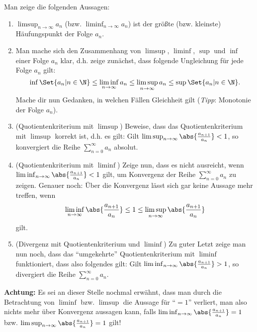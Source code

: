 \begin{exercise}
  Man zeige die folgenden Aussagen:
  \begin{enumerate}[label=(\alph*)]
  \item $\limsup_{n \to \infty} a_n$ (bzw. $\liminf_{n \to \infty} a_n$) ist der
    größte (bzw. kleinste) Häufungspunkt der Folge $a_n$.

  \item Man mache sich den Zusammenhang von $\limsup$, $\liminf$, $\sup$ und
    $\inf$ einer Folge $a_n$ klar, d.h. zeige zunächst, dass folgende
    Ungleichung für jede Folge $a_n$ gilt:
    \begin{equation*}
      \inf \Set{a_n | n \in \N}
      \leq
      \liminf_{n \to \infty} a_n
      \leq
      \limsup_{n \to \infty} a_n
      \leq
      \sup \Set{a_n | n \in \N}.
    \end{equation*}
    Mache dir nun Gedanken, in welchen Fällen Gleichheit gilt (\emph{Tipp}:
    Monotonie der Folge $a_n$).

  \item (Quotientenkriterium mit $\limsup$) Beweise, dass das
    Quotientenkriterium mit $\limsup$ korrekt ist, d.h. es gilt: Gilt
    $\limsup_{n \to \infty} \abs{\frac{a_{n+1}}{a_n}} < 1$, so konvergiert die
    Reihe $\displaystyle \sum_{n=0}^{\infty}a_n$ absolut.

  \item (Quotientenkriterium mit $\liminf$) Zeige nun, dass es nicht ausreicht,
    wenn $\liminf_{n \to \infty} \abs{\frac{a_{n+1}}{a_n}} < 1$ gilt, um
    Konvergenz der Reihe $\displaystyle \sum_{n=0}^{\infty}a_n$ zu zeigen.
    Genauer noch: Über die Konvergenz lässt sich gar keine Aussage mehr treffen,
    wenn
    \begin{equation*}
      \liminf_{n \to \infty} \abs{\frac{a_{n+1}}{a_n}}
      \leq
      1
      \leq
      \limsup_{n \to \infty} \abs{\frac{a_{n+1}}{a_n}}
    \end{equation*}
    gilt.

  \item(Divergenz mit Quotientenkriterium und $\liminf$) Zu guter Letzt zeige
    man nun noch, dass das \enquote{umgekehrte} Quotientenkriterium mit
    $\liminf$ funktioniert, dass also folgendes gilt: Gilt
    $\liminf_{n \to \infty} \abs{\frac{a_{n+1}}{a_n}} > 1$, so divergiert die Reihe
    $\displaystyle \sum_{n=0}^{\infty}a_n$.
  \end{enumerate}
  \textbf{Achtung:} Es sei an dieser Stelle nochmal erwähnt, dass man durch die
  Betrachtung von $\liminf$ bzw. $\limsup$ die Aussage für \enquote{$=1$}
  verliert, man also nichts mehr über Konvergenz aussagen kann, falls
  $\liminf_{n \to \infty} \abs{\frac{a_{n+1}}{a_n}} = 1$ bzw.
  $\limsup_{n \to \infty} \abs{\frac{a_{n+1}}{a_n}} = 1$ gilt!
\end{exercise}
